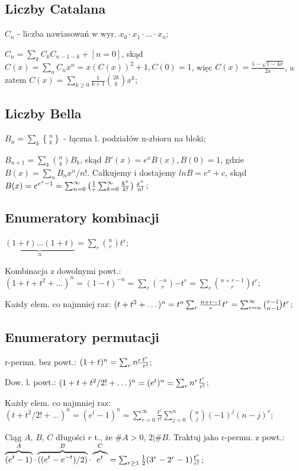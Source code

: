 \documentclass[10pt,a4paper,twocolumn]{article}
\begin{document}
\subsection{Liczby Catalana}

$C_n$ - liczba nawiasowań w wyr. $x_0 \cdot x_1 \cdot \dots \cdot x_n$;

$C_n = \sum_kC_kC_{n-1-k} + [n=0]$,
  skąd $C(x) = \sum_n C_nx^n = x(C(x))^2 + 1, C(0) = 1$,
  więc $C(x) = \frac{1 - \sqrt{1-4x}}{2x}$, a zatem $C(x) =
  \sum_{k\geq 0} \frac{1}{k+1}\binom{2k}{k}x^k$;

\subsection{Liczby Bella}

${B_n = \sum_k{n \brace k}}$ - łączna l. podziałów n-zbioru na bloki;

${B_{n+1} = \sum_k \binom{n}{k} B_k}$, skąd $B'(x) = e^xB(x), B(0) = 1$,
  gdzie $B(x) = \sum_n B_nx^n/n!$. Całkujemy i dostajemy $ln B = e^x + c$,
  skąd $B(x) = e^{e^x-1} =
  \sum_{n=0}^\infty \left ( {1 \over e} \sum_{k=0}^\infty {k^n \over k!}\right)
  {x^n \over n!}$;

\subsection{Enumeratory kombinacji}

$\underbrace{(1+t)\dots(1+t)}_n = \sum_r\binom{n}{r}t^r$;

Kombinacja z dowolnymi powt.: $(1+t+t^2+\dots)^n=(1-t)^{-n}=
  \sum_r\binom{-n}{r}{-t}^r=\sum_r\binom{n+r-1}{r}t^r$;

Każdy elem. co najmniej raz: $(t+t^2+\dots)^n = t^n\sum_r {n+r-1 \over r}t^r =
  \sum^\infty_{r=n}\binom{r-1}{n-1}t^r$;

\subsection{Enumeratory permutacji}

r-permu. bez powt.: $(1+t)^n = \sum_rn^{\underline{r}}{t^r \over r!}$;

Dow. l. powt.: ${(1+t+t^2/2! + \dots)^n} = {(e^{t})^n} =
  {\sum_rn^r{t^r \over r!}}$;

Każdy elem. co najmniej raz: $(t + t^2/2! + \dots)^n = (e^t - 1)^n =
  \sum^\infty_{r=0}\frac{t^r}{r!}\sum^n_{j=0}\binom{n}{j}(-1)^j(n-j)^r$;

Ciąg $A$, $B$, $C$ długości $r$ t., że $\#A>0$, $2|\#B$. Traktuj jako r-permu.
  z powt.:
  $\overbrace{(e^t - 1)}^A\cdot\overbrace{((e^t - e^{-t})/2)}^B
  \cdot\overbrace{e^t}^C =
  \sum_{r \geq 1} {1 \over 2}(3^r - 2^r - 1){t^r \over r!}$;
\end{document}

